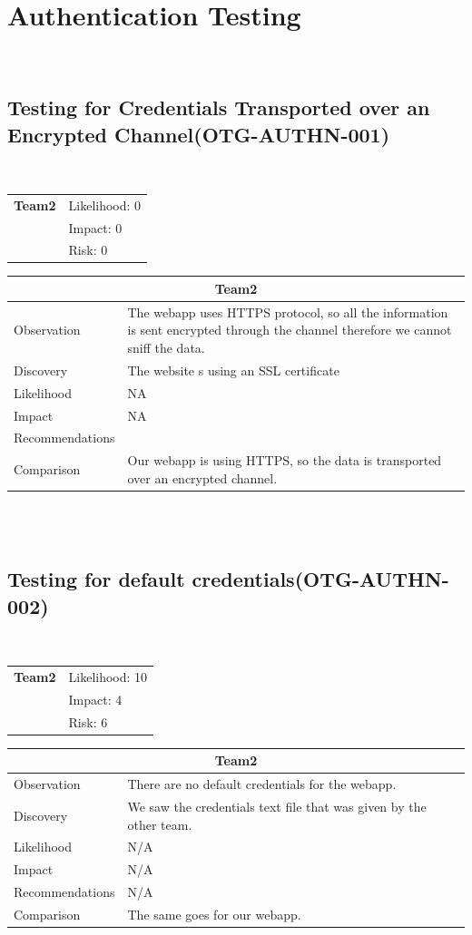 \documentclass[headsepline,footsepline,footinclude=false,oneside,fontsize=11pt,paper=a4,listof=totoc,bibliography=totoc]{scrbook} %
\begin{document}
\pagebreak

\section{Authentication Testing}\
\subsection{Testing for Credentials Transported over an Encrypted Channel(OTG-AUTHN-001)}\

\begin{tabular}{cR{12cm}}
	\textbf{Team2} & Likelihood: 0\\& Impact: 0\\& Risk: 0
\end{tabular}

\begin{tabular}{ l|p{11cm}  }
	\hline
	\multicolumn{2}{c}{\textbf{Team2}} \\
	\hline
	Observation   & The webapp uses HTTPS protocol, so all the information is sent encrypted through the channel therefore we cannot sniff the data.\\
	Discovery  & The website s using an SSL certificate \\
	Likelihood & NA \\
	Impact    & NA\\
	Recommendations &   \\
	Comparison & Our webapp is using HTTPS, so the data is transported over an encrypted channel.\\
	\hline
\end{tabular}
\\
\vspace{0.5cm}
\\


\pagebreak
\subsection{Testing for default credentials(OTG-AUTHN-002)}\
\begin{tabular}{cR{12cm}}
	\textbf{Team2} & Likelihood: 10\\& Impact: 4\\& Risk: 6
\end{tabular}

\begin{tabular}{ l|p{11cm}  }
	\hline
	\multicolumn{2}{c}{\textbf{Team2}} \\
	\hline
	Observation   & There are no default credentials for the webapp. \\
	Discovery  & We saw the credentials text file that was given by the other team.\\
	Likelihood & N/A \\
	Impact    &  N/A \\
	Recommendations &  N/A\\
	Comparison & The same goes for our webapp.\\
	\hline
\end{tabular}
 
\end{document}
